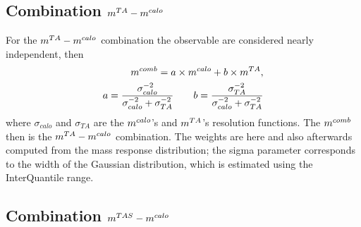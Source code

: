 

\subsection{Combination $m^{TA}-m^{calo}$ }

For the $m^{TA}-m^{calo}$ combination the observable are considered nearly independent, then
\begin{equation}\begin{split}
 m^{comb}= a\times m^{calo} + b \times m^{TA},\\
 a=\frac{\sigma_{calo}^{-2}}{\sigma_{calo}^{-2}+\sigma_{TA}^{-2}} \qquad b=\frac{\sigma_{TA}^{-2}}{\sigma_{calo}^{-2}+\sigma_{TA}^{-2}}
\end{split}
\label{eq:mtacomb}
\end{equation}
where $\sigma_{calo}$ and $\sigma_{TA}$ are the $m^{calo}$'s and $m^{TA}$'s resolution functions. The $m^{comb}$ then is the $m^{TA}-m^{calo}$ combination.
The weights are here and also afterwards computed from the mass response distribution; the sigma parameter corresponds to the width of the Gaussian distribution, which is estimated using the InterQuantile range. 

\subsection{Combination $m^{TAS}-m^{calo}$ }

